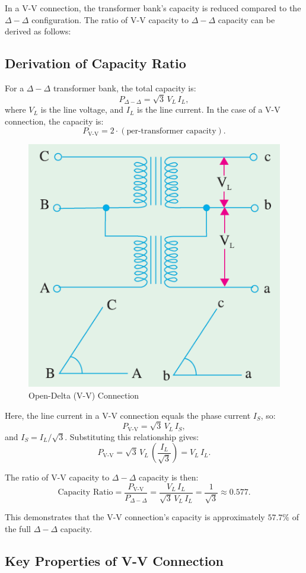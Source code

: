 \documentclass[a4paper,12pt]{article}
\begin{document}
	In a V-V connection, the transformer bank's capacity is reduced compared to the $\Delta-\Delta$ configuration. The ratio of V-V capacity to $\Delta-\Delta$ capacity can be derived as follows:
		\subsection{Derivation of Capacity Ratio}
	
	For a $\Delta-\Delta$ transformer bank, the total capacity is:
	\[
	P_{\Delta-\Delta} = \sqrt{3} \, V_L \, I_L,
	\]
	where \( V_L \) is the line voltage, and \( I_L \) is the line current.
		In the case of a V-V connection, the capacity is:
	\[
	P_{\text{V-V}} = 2 \cdot (\text{per-transformer capacity}).
	\]
	\begin{figure}[H]
		\centering
		\includegraphics[width=0.5\linewidth]{screenshot001}
		\caption{Open-Delta (V-V) Connection}
		\label{fig:screenshot001}
	\end{figure}

	

	Here, the line current in a V-V connection equals the phase current \( I_S \), so:
	\[
	P_{\text{V-V}} = \sqrt{3} \, V_L \, I_S,
	\]
	and \( I_S = I_L / \sqrt{3} \). Substituting this relationship gives:
	\[
	P_{\text{V-V}} = \sqrt{3} \, V_L \, \left(\frac{I_L}{\sqrt{3}}\right) = V_L \, I_L.
	\]
	
	The ratio of V-V capacity to $\Delta-\Delta$ capacity is then:
	\[
	\text{Capacity Ratio} = \frac{P_{\text{V-V}}}{P_{\Delta-\Delta}} = \frac{V_L \, I_L}{\sqrt{3} \, V_L \, I_L} = \frac{1}{\sqrt{3}} \approx 0.577.
	\]
	
	This demonstrates that the V-V connection's capacity is approximately \( 57.7\% \) of the full $\Delta-\Delta$ capacity.
	
	\subsection{Key Properties of V-V Connection}
	
\end{document}
